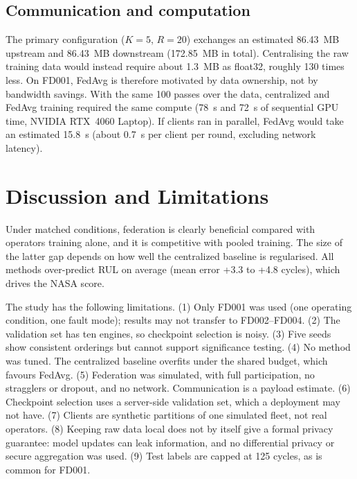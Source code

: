 \subsection{Communication and computation}

The primary configuration ($K=5$, $R=20$) exchanges an estimated 86.43~MB upstream
and 86.43~MB downstream (172.85~MB in total). Centralising the raw training data
would instead require about 1.3~MB as float32, roughly 130 times less. On FD001,
FedAvg is therefore motivated by data ownership, not by bandwidth savings. With
the same 100 passes over the data, centralized and FedAvg training required the same
compute (78~s and 72~s of sequential GPU time, NVIDIA RTX~4060 Laptop). If clients
ran in parallel, FedAvg would take an estimated 15.8~s (about 0.7~s per client per
round, excluding network latency).

\section{Discussion and Limitations}\label{sec:limitations}

Under matched conditions, federation is clearly beneficial compared with
operators training alone, and it is competitive with pooled training. The size of
the latter gap depends on how well the centralized baseline is regularised. All
methods over-predict RUL on average (mean error +3.3 to +4.8 cycles), which
drives the NASA score.

The study has the following limitations.
(1) Only FD001 was used (one operating condition, one fault mode); results may not
transfer to FD002--FD004.
(2) The validation set has ten engines, so checkpoint selection is noisy.
(3) Five seeds show consistent orderings but cannot support significance testing.
(4) No method was tuned. The centralized baseline overfits under the shared budget,
which favours FedAvg.
(5) Federation was simulated, with full participation, no stragglers or dropout,
and no network. Communication is a payload estimate.
(6) Checkpoint selection uses a server-side validation set, which a deployment may
not have.
(7) Clients are synthetic partitions of one simulated fleet, not real operators.
(8) Keeping raw data local does not by itself give a formal privacy guarantee:
model updates can leak information, and no differential privacy or secure
aggregation was used.
(9) Test labels are capped at 125 cycles, as is common for FD001.

